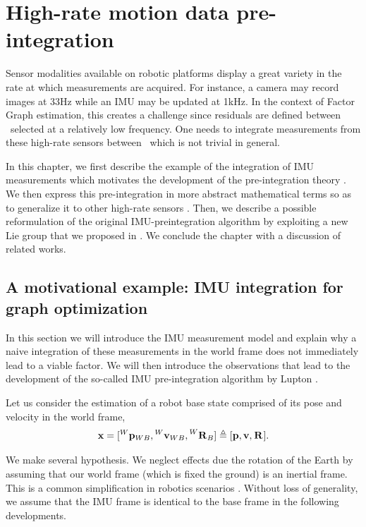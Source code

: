 \chapter{High-rate motion data pre-integration}
\label{chp:preintegration}
\minitoc
\bigskip


Sensor modalities available on robotic platforms display a great variety in the rate at which measurements are acquired. For instance, 
a camera may record images at 33Hz while an IMU may be updated at 1kHz. In the context of Factor Graph estimation, this creates a challenge since residuals
are defined between \keyframes\ selected at a relatively low frequency. One needs to integrate measurements from these high-rate sensors between \keyframes\,
which is not trivial in general.

In this chapter, we first describe the example of the integration of IMU measurements which motivates the development of the pre-integration theory \cite{lupton-09,forster2017-TRO}.
We then express this pre-integration in more abstract mathematical terms so as to generalize it to other high-rate sensors \cite{atchuthan-18-thesis}. 
Then, we describe a possible reformulation of the original IMU-preintegration algorithm \cite{forster2017-TRO} by exploiting a new Lie group that we 
proposed in \cite{fourmy2019absolute}. We conclude the chapter with a discussion of related works.

  
\section{A motivational example: IMU integration for graph optimization}
\label{sec:imu_preint_motivation}

In this section we will introduce the IMU measurement model and explain why a naive integration of these measurements in the world frame does not immediately
lead to a viable factor. We will then introduce the observations that lead to the development of the so-called IMU pre-integration algorithm by Lupton \cite{lupton-09}.

Let us consider the estimation of a robot base state comprised of its pose and velocity in the world frame,
%
\begin{equation}
    {\bf x} = [\prescript{W}{}{{\bf p}}_{WB}, \prescript{W}{}{{\bf v}}_{WB}, \prescript{W}{}{{\bf R}}_{B}]
    \triangleq 
    [{\bf p}, {\bf v}, \prescript{}{}{{\bf R}}_{}].
\end{equation}

We make several hypothesis. We neglect effects due the rotation of the Earth by assuming 
that our world frame (which is fixed \wrt the ground) is an inertial frame. This is a common simplification in robotics scenarios \cite{forster2017-TRO}. 
Without loss of generality, we assume that the IMU frame is identical to the base frame in the following developments.

